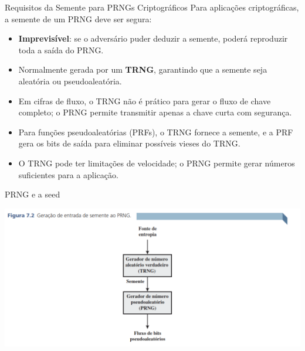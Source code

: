 \begin{frame}{Requisitos da Semente para PRNGs Criptográficos}
    Para aplicações criptográficas, a semente de um PRNG deve ser segura:

    \begin{itemize}
        \item \textbf{Imprevisível}: se o adversário puder deduzir a semente, poderá reproduzir toda a saída do PRNG.
        \item Normalmente gerada por um \textbf{TRNG}, garantindo que a semente seja aleatória ou pseudoaleatória.
    \end{itemize}

    \medskip

    \begin{itemize}
        \item Em cifras de fluxo, o TRNG não é prático para gerar o fluxo de chave completo; o PRNG permite transmitir apenas a chave curta com segurança.
        \item Para funções pseudoaleatórias (PRFs), o TRNG fornece a semente, e a PRF gera os bits de saída para eliminar possíveis vieses do TRNG.
        \item O TRNG pode ter limitações de velocidade; o PRNG permite gerar números suficientes para a aplicação.
    \end{itemize}
\end{frame}

\begin{frame}{PRNG e a seed}

    \centering
    \includegraphics[width=0.9\linewidth]{Figuras/semente-entrando-prng.png}


\end{frame}

